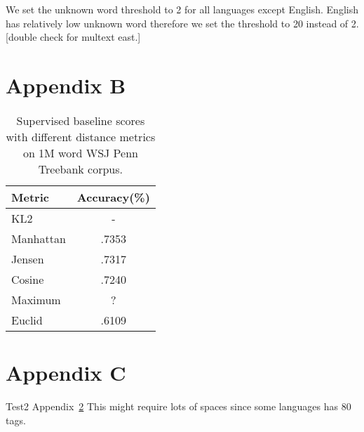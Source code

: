 We set the unknown word threshold to 2 for all languages except
English.  English has relatively low unknown word therefore we set the
threshold to 20 instead of 2.[double check for multext east.]

\section{Appendix B}
\label{app:dist1M}
\begin{table}[ht] \centering
\begin{tabular}{|l|c|}
\hline
Metric & Accuracy(\%) \\
\hline
KL2 & - \\
Manhattan & .7353\\ %
Jensen & .7317 \\ %
Cosine & .7240 \\ %
Maximum & ? \\
Euclid & .6109 \\ %
\hline
\end{tabular}
\caption{Supervised baseline scores with different 
distance metrics on 1M word WSJ Penn Treebank corpus.}
\label{tab:distscores1M}
\end{table}


\section{Appendix C}
\label{app:tags}
Test2 Appendix~\ref{app:tags} This might require lots of spaces since
some languages has 80 tags.
